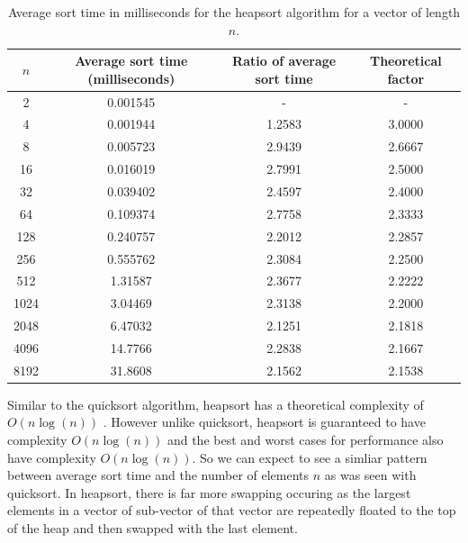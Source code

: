 \documentclass[a4paper, 12pt]{article}
\begin{document}
\begin{table}[H]
\centering
\begin{tabular}{ c | c | c | c }
$n$ & Average sort time (milliseconds) & Ratio of average sort time & Theoretical factor \\ \hline
         2     &       0.001545 & - & - \\
         4     &       0.001944 & 1.2583 & 3.0000 \\
         8     &       0.005723 & 2.9439 & 2.6667\\
        16    &        0.016019 & 2.7991 & 2.5000\\
        32     &       0.039402 & 2.4597& 2.4000\\
        64     &       0.109374 & 2.7758 & 2.3333\\
       128     &       0.240757 & 2.2012& 2.2857\\
       256     &       0.555762 & 2.3084& 2.2500\\
       512     &        1.31587 & 2.3677& 2.2222\\
      1024     &        3.04469 &2.3138 & 2.2000\\
      2048     &        6.47032 & 2.1251 & 2.1818\\
      4096     &        14.7766 & 2.2838 & 2.1667\\
      8192      &       31.8608 & 2.1562& 2.1538\\
\end{tabular}
\caption{Average sort time in milliseconds for the heapsort algorithm for a vector of length $n$.}
\end{table}

Similar to the quicksort algorithm, heapsort has a theoretical complexity of $O(n\log(n))$ \cite{Biggaretal08}. However unlike quicksort, heapsort is guaranteed to have complexity $O(n\log(n))$ and the best and worst cases for performance also have complexity $O(n\log(n))$. So we can expect to see a simliar pattern between average sort time and the number of elements $n$ as was seen with quicksort. In heapsort, there is far more swapping occuring as the largest elements in a vector of sub-vector of that vector are repeatedly floated to the top of the heap and then swapped with the last element.    
\end{document}
